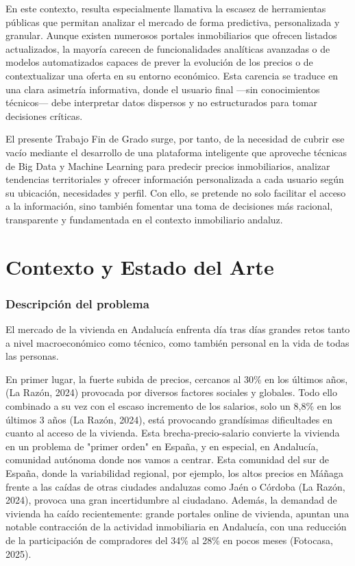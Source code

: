 \documentclass[a4paper,11pt]{book}
\begin{document}
En este contexto, resulta especialmente llamativa la escasez de herramientas públicas que permitan analizar el mercado de forma predictiva, personalizada y granular. Aunque existen numerosos portales inmobiliarios que ofrecen listados actualizados, la mayoría carecen de funcionalidades analíticas avanzadas o de modelos automatizados capaces de prever la evolución de los precios o de contextualizar una oferta en su entorno económico. Esta carencia se traduce en una clara asimetría informativa, donde el usuario final —sin conocimientos técnicos— debe interpretar datos dispersos y no estructurados para tomar decisiones críticas.

El presente Trabajo Fin de Grado surge, por tanto, de la necesidad de cubrir ese vacío mediante el desarrollo de una plataforma inteligente que aproveche técnicas de Big Data y Machine Learning para predecir precios inmobiliarios, analizar tendencias territoriales y ofrecer información personalizada a cada usuario según su ubicación, necesidades y perfil. Con ello, se pretende no solo facilitar el acceso a la información, sino también fomentar una toma de decisiones más racional, transparente y fundamentada en el contexto inmobiliario andaluz.

\chapter{Contexto y Estado del Arte}
\subsection{Descripción del problema}

El mercado de la vivienda en Andalucía enfrenta día tras días grandes retos tanto a nivel macroeconómico como técnico, como también personal en la vida de todas las personas.

En primer lugar, la fuerte subida de precios, cercanos al 30\% en los últimos años, (La Razón, 2024) provocada por diversos factores sociales y globales. Todo ello combinado a su vez con el escaso incremento de los salarios, solo un 8,8\% en los últimos 3 años (La Razón, 2024), está provocando grandísimas dificultades en cuanto al acceso de la vivienda. Esta brecha-precio-salario convierte la vivienda en un problema de "primer orden" en España, y en especial, en Andalucía, comunidad autónoma donde nos vamos a centrar. 
Esta comunidad del sur de España, donde la variabilidad regional, por ejemplo, los altos precios en Máñaga frente a las caídas de otras ciudades andaluzas como Jaén o Córdoba (La Razón, 2024), provoca una gran incertidumbre al ciudadano. Además, la demandad de vivienda ha caído recientemente: grande portales online de vivienda, apuntan una notable contracción de la actividad inmobiliaria en Andalucía, con una reducción de la participación de compradores del 34\% al 28\% en pocos meses (Fotocasa, 2025).
\end{document}
